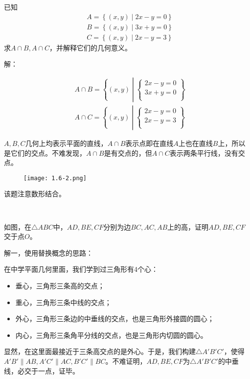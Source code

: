 \begin{example}
已知
\begin{align*}
&A=\left\{ \left( x,y \right) \middle| 2x-y=0 \right\} \\
&B=\left\{ \left( x,y \right) \middle| 3x+y=0 \right\} \\
&C=\left\{ \left( x,y \right) \middle| 2x-y=3 \right\}
\end{align*}
求$A\cap B,A\cap C$，并解释它们的几何意义。
\end{example}

解：

\begin{align*}
&A\cap B=\left\{ \left( x,y \right) \middle| \left\{ \begin{array}{c}
	2x-y=0\\
	3x+y=0\\
\end{array} \right. \right\} \\
&A\cap C=\left\{ \left( x,y \right) \middle| \left\{ \begin{array}{c}
	2x-y=0\\
	2x-y=3\\
\end{array} \right. \right\}
\end{align*}

$A,B,C$几何上均表示平面的直线，$A\cap B$表示点即在直线$A$上也在直线$B$上，所以是它们的交点。不难发现，$A\cap B$是有交点的，但$A\cap C$表示两条平行线，没有交点。
\begin{figure}[ht]
\centering
\texttt{[image: 1.6-2.png]}
\end{figure}

\begin{tcolorbox}
该题注意数形结合。
\end{tcolorbox}

~

\begin{example}
如图，在$\bigtriangleup ABC$中，$AD,BE,CF$分别为边$BC,AC,AB$上的高，证明$AD,BE,CF$交于点$O$。
\end{example}

解一，使用替换概念的思路：

在中学平面几何里面，我们学到过三角形有4个心：
\begin{itemize}
    \item 垂心，三角形三条高的交点；
    \item 重心，三角形三条中线的交点；
    \item 外心，三角形三条边的中垂线的交点，也是三角形外接圆的圆心；
    \item 内心，三角形三条角平分线的交点，也是三角形内切圆的圆心。
\end{itemize}
显然，在这里面最接近于三条高交点的是外心。于是，我们构建$\bigtriangleup A'B'C'$，使得$A'B'\parallel AB,A'C'\parallel AC,B'C'\parallel BC$。不难证明，$AD,BE,CF$为$\bigtriangleup A'B'C'$的中垂线，必交于一点，证毕。

